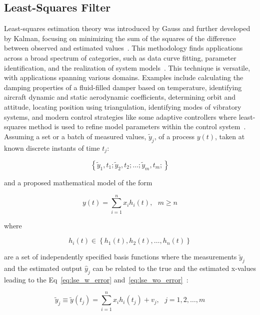 \subsection{Least-Squares Filter}
Least-squares estimation theory was introduced by Gauss and further developed by Kalman, focusing on minimizing the sum of the squares of the difference between observed and estimated values~\cite{sorenson1970lse}. This methodology finds applications across a broad spectrum of categories, such as data curve fitting, parameter identification, and the realization of system models~\cite{crassidis2004dynamic}. This technique is versatile, with applications spanning various domains. Examples include calculating the damping properties of a fluid-filled damper based on temperature, identifying aircraft dynamic and static aerodynamic coefficients, determining orbit and attitude, locating position using triangulation, identifying modes of vibratory systems, and modern control strategies like some adaptive controllers where least-squares method is used to refine model parameters within the control system~\cite{crassidis2004dynamic}. \\

Assuming a set or a batch of measured values, $\tilde{y}_{j}$, of a process $y(t)$, taken at known discrete instants of time $t_{j}$:

\begin{equation}
    \left\{\tilde{y}_{1}, t_{1}; \tilde{y}_{2}, t_{2}; \ldots; \tilde{y}_{m}, t_{m}; \right\}
\end{equation}

and a proposed mathematical model of the form

\begin{equation}
    y(t) = \sum_{i = 1}^{n}{x_{i} h_{i}(t)},~~~m \geq n
\end{equation}

where

\begin{equation}
    h_{i}(t) \in \left\{ h_{1}(t), h_{2}(t), \ldots, h_{n}(t) \right\}
\end{equation}

are a set of independently specified basis functions where the measurements $\tilde{y}_{j}$ and the estimated output $\hat{y}_{j}$ can be related to the true and the estimated x-values leading to the Eq~\ref{eq:lse_w_error} and~\ref{eq:lse_wo_error}~\cite{crassidis2004dynamic}:

\begin{equation}
    \tilde{y}_{j} \equiv \tilde{y}(t_{j}) = \sum_{i = 1}^{n}{x_{i} h_{i}(t_{j}) + v_{j}},~~~j = 1, 2, \ldots, m
    \label{eq:lse_w_error}
\end{equation}

